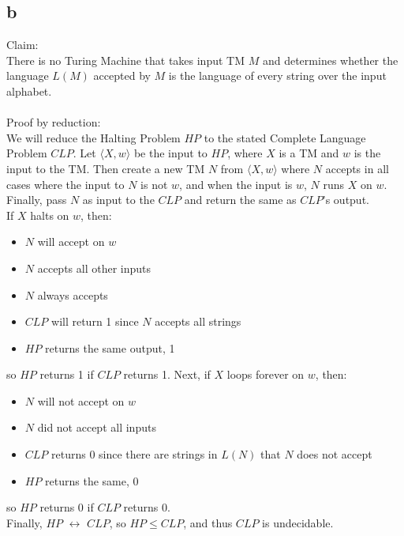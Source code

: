 \documentclass[letterpaper,notitlepage,twoside]{article}
\begin{document}
\subsection*{b}
Claim:\\
There is no Turing Machine that takes input TM $M$ and determines whether the language $L(M)$ accepted by $M$ is the language of every string over the input alphabet.\\\\
Proof by reduction:\\
We will reduce the Halting Problem $HP$ to the stated Complete Language Problem $CLP$. Let $\langle X, w \rangle$ be the input to $HP$, where $X$ is a TM and $w$ is the input to the TM.  Then create a new TM $N$ from $\langle X, w \rangle$ where $N$ accepts in all cases where the input to $N$ is not $w$, and when the input is $w$, $N$ runs $X$ on $w$. Finally, pass $N$ as input to the $CLP$ and return the same as $CLP$'s output.\\
If $X$ halts on $w$, then:
\begin{itemize}
\item $N$ will accept on $w$
\item $N$ accepts all other inputs
\item $N$ always accepts
\item $CLP$ will return 1 since $N$ accepts all strings
\item $HP$ returns the same output, 1
\end{itemize}
so $HP$ returns 1 if $CLP$ returns 1.
Next, if $X$ loops forever on $w$, then:
\begin{itemize}
\item $N$ will not accept on $w$
\item $N$ did not accept all inputs
\item $CLP$ returns 0 since there are strings in $L(N)$ that $N$ does not accept
\item $HP$ returns the same, 0
\end{itemize}
so $HP$ returns 0 if $CLP$ returns 0.\\
Finally, $HP$ $\leftrightarrow$ $CLP$, so $HP \le CLP$, and thus $CLP$ is undecidable.
\end{document}
